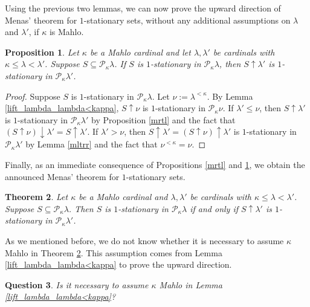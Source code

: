 \documentclass[a4paper,12pt,reqno,oneside]{amsart}
\theoremstyle{plain}
\newtheorem{theorem}{Theorem}[section]
\newtheorem{prop}[theorem]{Proposition}
\newtheorem{question}[theorem]{Question}
\newcommand{\mcal}{\mathcal}
\begin{document}
Using the previous two lemmas, we can now prove the upward direction of Menas’ theorem for $1$-stationary sets, without any additional assumptions on $\lambda$ and $\lambda'$, if $\kappa$ is Mahlo.

\begin{prop} \label{upwards_Menas_1stat}
Let $\kappa$ be a Mahlo cardinal and let $\lambda , \lambda '$ be cardinals with $\kappa \leq \lambda < \lambda '$. Suppose $S \subseteq \mcal{P}_\kappa \lambda$. If $S$ is $1$-stationary in $\mcal{P}_\kappa \lambda$, then $S \uparrow \lambda '$ is $1$-stationary in $\mcal{P}_\kappa \lambda '$.
\end{prop}

\begin{proof}
Suppose $S$ is $1$-stationary in $\mcal{P}_\kappa \lambda$. Let $\nu := \lambda^{< \kappa}$. By Lemma \ref{lift_lambda_lambda<kappa}, $S \uparrow \nu$ is $1$-stationary in $\mcal{P}_\kappa \nu$. If $\lambda ' \leq \nu$, then $S \uparrow \lambda '$ is $1$-stationary in $\mcal{P}_\kappa \lambda '$ by Proposition \ref{mrtl} and the fact that $( S \uparrow \nu ) \downarrow \lambda' = S \uparrow \lambda'$. If $\lambda ' > \nu$, then $S \uparrow \lambda ' = ( S \uparrow \nu ) \uparrow \lambda '$ is $1$-stationary in $\mcal{P}_\kappa \lambda '$ by Lemma \ref{mltrr} and the fact that $\nu^{< \kappa} = \nu$.
\end{proof}

Finally, as an immediate consequence of Propositions \ref{mrtl} and \ref{upwards_Menas_1stat}, we obtain the announced Menas' theorem for  $1$-stationary sets.


\begin{theorem} \label{thm:Menas_1stat}
Let $\kappa$ be a Mahlo cardinal and $\lambda , \lambda '$ be cardinals with $\kappa \leq \lambda< \lambda'$. Suppose $S \subseteq \mcal{P}_\kappa \lambda$. Then $S$ is $1$-stationary in $\mcal{P}_{\kappa}\lambda$ if and only if $S \uparrow \lambda '$ is $1$-stationary in $\mcal{P}_{\kappa}{\lambda'}$.
\end{theorem}


As we mentioned before, we do not know whether it is necessary to assume $\kappa$ Mahlo in Theorem \ref{thm:Menas_1stat}. This assumption comes from Lemma \ref{lift_lambda_lambda<kappa} to prove the upward direction.


\begin{question}
Is it necessary to assume $\kappa$ Mahlo in Lemma \ref{lift_lambda_lambda<kappa}?
\end{question}
\end{document}
